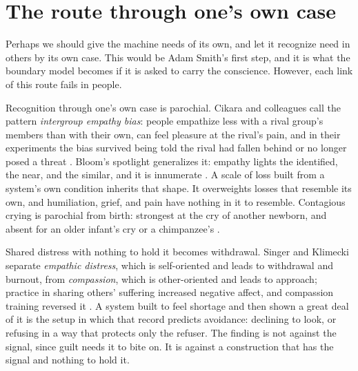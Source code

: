 \section{The route through one's own case}
\label{sec:20.2}
Perhaps we should give the machine needs of its own, and let it recognize need in others by its own case. This would be Adam Smith's first step, and it is what the boundary model becomes if it is asked to carry the conscience. However, each link of this route fails in people.

Recognition through one's own case is parochial. Cikara and colleagues call the pattern \emph{intergroup empathy bias}: people empathize less with a rival group's members than with their own, can feel pleasure at the rival's pain, and in their experiments the bias survived being told the rival had fallen behind or no longer posed a threat \autocite{Cikara2014TheirPain}. Bloom's spotlight generalizes it: empathy lights the identified, the near, and the similar, and it is innumerate \autocite{bloom2016against}. A scale of loss built from a system's own condition inherits that shape. It overweights losses that resemble its own, and humiliation, grief, and pain have nothing in it to resemble. Contagious crying is parochial from birth: strongest at the cry of another newborn, and absent for an older infant's cry or a chimpanzee's \autocite{martin1982distress}.

Shared distress with nothing to hold it becomes withdrawal. Singer and Klimecki separate \emph{empathic distress}, which is self-oriented and leads to withdrawal and burnout, from \emph{compassion}, which is other-oriented and leads to approach; practice in sharing others' suffering increased negative affect, and compassion training reversed it \autocite{singer2014empathy,klimecki2013differential}. A system built to feel shortage and then shown a great deal of it is the setup in which that record predicts avoidance: declining to look, or refusing in a way that protects only the refuser. The finding is not against the signal, since guilt needs it to bite on. It is against a construction that has the signal and nothing to hold it.

